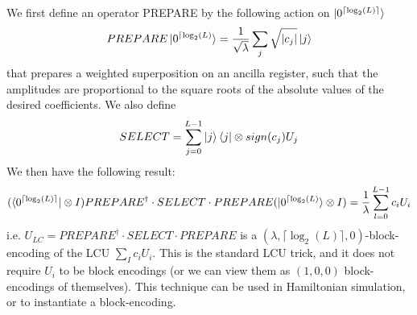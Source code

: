 \documentclass[12pt, oneside]{book}
\theoremstyle{definition}
\theoremstyle{definition}
\theoremstyle{remark}
\begin{document}
We first define an operator PREPARE by the following action on $\ket{0^{\lceil \log_2(L)\rceil}}$
\[
PREPARE\ket{0^{\lceil \log_2(L)}}=\frac{1}{\sqrt{\lambda}} \sum_j \sqrt{|c_j|}\ket{j}
\]
that prepares a weighted superposition on an ancilla register, such that the amplitudes are proportional to the square roots of the absolute values of the desired coefficients. We also define
\[
SELECT=\sum_{j=0}^{L-1}\ket{j}\bra{j}\otimes sign(c_j)U_j
\]
We then have the following result:
\[
(\bra{0^{\lceil \log_2(L)\rceil}}\otimes I)PREPARE^{\dagger}\cdot SELECT\cdot PREPARE (\ket{0^{\lceil \log_2(L)}}\otimes I)=\frac{1}{\lambda} \sum_{l=0}^{L-1} c_iU_i
\]
i.e. $U_{LC}=PREPARE^{\dagger}\cdot SELECT\cdot PREPARE$ is a $(\lambda,\lceil\log_2(L)\rceil,0)$-block-encoding of the LCU $\sum_Ic_iU_i$. This is the standard LCU trick, and it does not require $U_i$ to be block encodings (or we can view them as $(1,0,0)$ block-encodings of themselves). This technique can be used in Hamiltonian simulation, or to instantiate a block-encoding.
\end{document}
